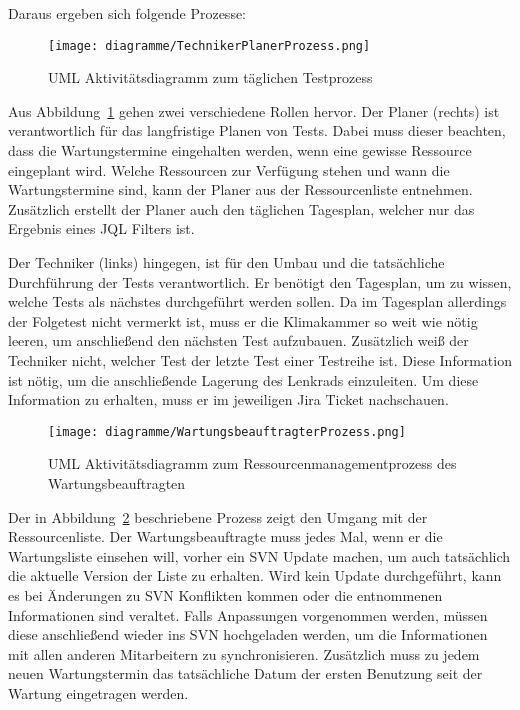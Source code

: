 Daraus ergeben sich folgende Prozesse:

\begin{figure}[H]
    \texttt{[image: diagramme/TechnikerPlanerProzess.png]}
    \caption{UML Aktivitätsdiagramm zum täglichen Testprozess}\label{fig:TechnikerPlanerProzess}
\end{figure}

Aus Abbildung~\ref{fig:TechnikerPlanerProzess} gehen zwei verschiedene Rollen hervor. Der
Planer (rechts) ist verantwortlich für das langfristige Planen von Tests. Dabei muss
dieser beachten, dass die Wartungstermine eingehalten werden, wenn
eine gewisse Ressource eingeplant wird. Welche Ressourcen zur
Verfügung stehen und wann die Wartungstermine sind, kann der Planer aus
der Ressourcenliste entnehmen. Zusätzlich erstellt der Planer auch den täglichen 
Tagesplan, welcher nur das Ergebnis eines \gls{JQL} Filters ist. 

Der Techniker (links) hingegen, ist für den Umbau und die tatsächliche Durchführung der 
Tests verantwortlich. Er benötigt den Tagesplan, um zu wissen, welche Tests als 
nächstes durchgeführt werden sollen. Da im Tagesplan allerdings der Folgetest 
nicht vermerkt ist, muss er die Klimakammer so weit wie nötig leeren, um 
anschließend den nächsten Test aufzubauen. Zusätzlich weiß der Techniker nicht, 
welcher Test der letzte Test einer Testreihe ist.
Diese Information ist nötig, um die anschließende Lagerung des Lenkrads einzuleiten.
Um diese Information zu erhalten, muss er im jeweiligen \gls{Jira} Ticket nachschauen. \\

\begin{figure}[H]
    \texttt{[image: diagramme/WartungsbeauftragterProzess.png]}
    \caption{UML Aktivitätsdiagramm zum Ressourcenmanagementprozess des Wartungsbeauftragten}\label{fig:WarterProzess}
\end{figure}

Der in Abbildung~\ref{fig:WarterProzess} beschriebene Prozess zeigt den Umgang mit der 
Ressourcenliste. Der Wartungsbeauftragte muss jedes Mal, wenn er die Wartungsliste
einsehen will, vorher ein \gls{SVN} Update machen, um auch tatsächlich die aktuelle
Version der Liste zu erhalten. Wird kein Update durchgeführt, kann es bei Änderungen 
zu \gls{SVN} Konflikten kommen oder die entnommenen Informationen sind veraltet.
Falls Anpassungen vorgenommen werden, müssen diese anschließend wieder ins 
\gls{SVN} hochgeladen werden, um die Informationen mit allen anderen Mitarbeitern
zu synchronisieren. Zusätzlich muss zu jedem neuen Wartungstermin das tatsächliche
Datum der ersten Benutzung seit der Wartung eingetragen werden. \\

